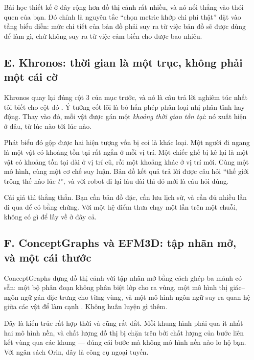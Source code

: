 \documentclass[../../deep_learning.tex]{subfiles}
\begin{document}
Bài học thiết kế ở đây rộng hơn đồ thị cảnh rất nhiều, và nó nối thẳng vào thói quen của bạn. Đó chính là nguyên tắc ``chọn metric khớp chi phí thật'' đặt vào tầng biểu diễn: mức chi tiết của bản đồ phải suy ra từ việc bản đồ sẽ được dùng để làm gì, chứ không suy ra từ việc cảm biến cho được bao nhiêu.

\subsection{E. Khronos: thời gian là một trục, không phải một cái cờ}
Khronos quay lại đúng cột 3 của mục trước, và nó là câu trả lời nghiêm túc nhất tôi biết cho cột đó \cite{schmid2024khronos}. Ý tưởng cốt lõi là bỏ hẳn phép phân loại nhị phân tĩnh hay động. Thay vào đó, mỗi vật được gán một \emph{khoảng thời gian tồn tại}: nó xuất hiện ở đâu, từ lúc nào tới lúc nào.

Phát biểu đó gộp được hai hiện tượng vốn bị coi là khác loại. Một người đi ngang là một vật có khoảng tồn tại rất ngắn ở mỗi vị trí. Một chiếc ghế bị kê lại là một vật có khoảng tồn tại dài ở vị trí cũ, rồi một khoảng khác ở vị trí mới. Cùng một mô hình, cùng một cơ chế suy luận. Bản đồ kết quả trả lời được câu hỏi ``thế giới trông thế nào lúc \(t\)'', và với robot đi lại lâu dài thì đó mới là câu hỏi đúng.

Cái giá thì thẳng thắn. Bạn cần bản đồ đặc, cần lưu lịch sử, và cần đủ nhiều lần đi qua để có bằng chứng. Với một hệ điểm thưa chạy một lần trên một chuỗi, không có gì để lấy về ở đây cả.

\subsection{F. ConceptGraphs và EFM3D: tập nhãn mở, và một cái thước}
ConceptGraphs dựng đồ thị cảnh với tập nhãn mở bằng cách ghép ba mảnh có sẵn: một bộ phân đoạn không phân biệt lớp cho ra vùng, một mô hình thị giác--ngôn ngữ gán đặc trưng cho từng vùng, và một mô hình ngôn ngữ suy ra quan hệ giữa các vật để làm cạnh \cite{gu2024conceptgraphs}. Không huấn luyện gì thêm.

Đây là kiến trúc rất hợp thời và cũng rất đắt. Mỗi khung hình phải qua ít nhất hai mô hình nền, và chất lượng đồ thị bị chặn trên bởi chất lượng của bước liên kết vùng qua các khung --- đúng cái bước mà không mô hình nền nào lo hộ bạn. Với ngân sách Orin, đây là công cụ ngoại tuyến.
\end{document}

